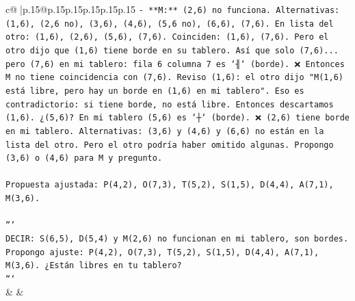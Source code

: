 \documentclass{article}
\begin{document}
{\begin{supertabular}{c@{$\;$}|p{.15\linewidth}@{}p{.15\linewidth}p{.15\linewidth}p{.15\linewidth}p{.15\linewidth}p{.15\linewidth}}
{{{\texttt{{-} **M:** (2,6) no funciona. Alternativas: (1,6), (2,6 no), (3,6), (4,6), (5,6 no), (6,6), (7,6). En lista del otro: (1,6), (2,6), (5,6), (7,6). Coinciden: (1,6), (7,6). Pero el otro dijo que (1,6) tiene borde en su tablero. Así que solo (7,6)... pero (7,6) en mi tablero: fila 6 columna 7 es `╢` (borde). ❌ Entonces M no tiene coincidencia con (7,6). Reviso (1,6): el otro dijo "M(1,6) está libre, pero hay un borde en (1,6) en mi tablero". Eso es contradictorio: si tiene borde, no está libre. Entonces descartamos (1,6). ¿(5,6)? En mi tablero (5,6) es `┼` (borde). ❌ (2,6) tiene borde en mi tablero. Alternativas: (3,6) y (4,6) y (6,6) no están en la lista del otro. Pero el otro podría haber omitido algunas. Propongo (3,6) o (4,6) para M y pregunto.} \\
\\ 
\texttt{Propuesta ajustada: P(4,2), O(7,3), T(5,2), S(1,5), D(4,4), A(7,1), M(3,6).} \\
\\ 
\texttt{```} \\
\texttt{DECIR: S(6,5), D(5,4) y M(2,6) no funcionan en mi tablero, son bordes. Propongo ajuste: P(4,2), O(7,3), T(5,2), S(1,5), D(4,4), A(7,1), M(3,6). ¿Están libres en tu tablero?} \\
\texttt{```} \\
            }
        }
    }
    & & \\ \\


\end{supertabular}}
\end{document}
